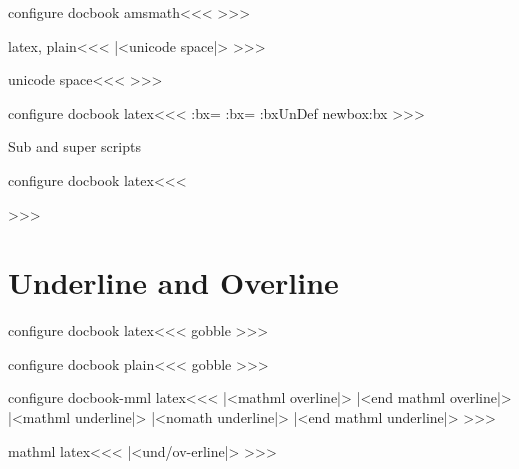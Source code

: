 \<configure docbook amsmath\><<<
\def\:temp{{\protect\AmSfont AMS}}
\HLet\AmS\:temp
>>>


\<latex, plain\><<<
|<unicode space|>
>>>

\<unicode space\><<<
\def\:nbsp{\HCode{\string&}\HChar{-35}\HCode{x00A0;}}%
>>>


\<configure docbook latex\><<<
    {\setbox\tmp:bx=\hbox\bgroup\let\@makefnmark\relax}
    {\egroup}%
    {}
   {\setbox\tmp:bx=\hbox\bgroup}
   {\egroup}
\ifx \tmp:bx\:UnDef \csname newbox\endcsname \tmp:bx \fi 
>>>


Sub and super scripts


\<configure docbook latex\><<<
  {}
  {}

  {}
  {}
>>>



\section{Underline and Overline}



\<configure docbook latex\><<<
   {\:gobble}
   {}
   {}
   {}
>>>

\<configure docbook plain\><<<
   {\hbox\bgroup \:gobble}
   {\egroup {}}
   {}
   {}
>>>







\<configure docbook-mml latex\><<<
   {\bgroup\ifmathml |<mathml overline|>\else
         \fi}
   {\ifmathml |<end mathml overline|>\else {}\fi\egroup}
   {\bgroup
    \ifmathml |<mathml underline|>%
    \else |<nomath underline|>\fi}
   {\ifmathml |<end mathml underline|>\else {}\fi \egroup}
>>>


\<mathml latex\><<<
|<und/ov-erline|>
>>>

